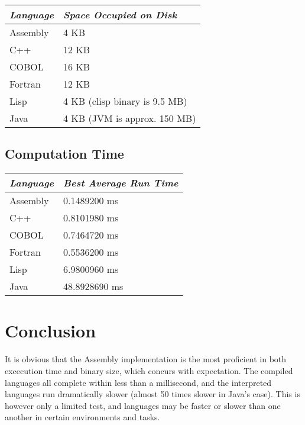 \documentclass[11pt,a4paper]{article}
\begin{document}
		\begin{center}
		\bgroup
		\def\arraystretch{1.5}
			\begin{tabular}{|l|l|}
				\hline
				\textit{Language} & \textit{Space Occupied on Disk}	\\ \hline
				Assembly & 4 KB                          			\\
				C++      & 12 KB                         			\\
				COBOL    & 16 KB                         			\\
				Fortran  & 12 KB                         			\\
				Lisp     & 4 KB (clisp binary is 9.5 MB) 			\\
				Java     & 4 KB (JVM is approx. 150 MB)  			\\ \hline
			\end{tabular}
		\egroup
		\end{center}
		\space
		\subsection*{Computation Time}
			\space
			\begin{center}
				\bgroup
				\def\arraystretch{1.5}
				\begin{tabular}{|l|l|}
					\hline
					\textit{Language} & \textit{Best Average Run Time} \\ \hline
					Assembly & 0.1489200 ms          \\
					C++      & 0.8101980 ms          \\
					COBOL    & 0.7464720 ms          \\
					Fortran  & 0.5536200 ms          \\
					Lisp     & 6.9800960 ms          \\
					Java     & 48.8928690 ms                     \\ \hline
				\end{tabular}
				\egroup
			\end{center}
	\section*{Conclusion}
	
	It is obvious that the Assembly implementation is the most proficient in both excecution time and binary size, which concurs with expectation. The compiled languages all complete within less than a millisecond, and the interpreted languages run dramatically slower (almost 50 times slower in Java's case). This is however only a limited test, and languages may be faster or slower than one another in certain environments and tasks.
	
\end{document}
